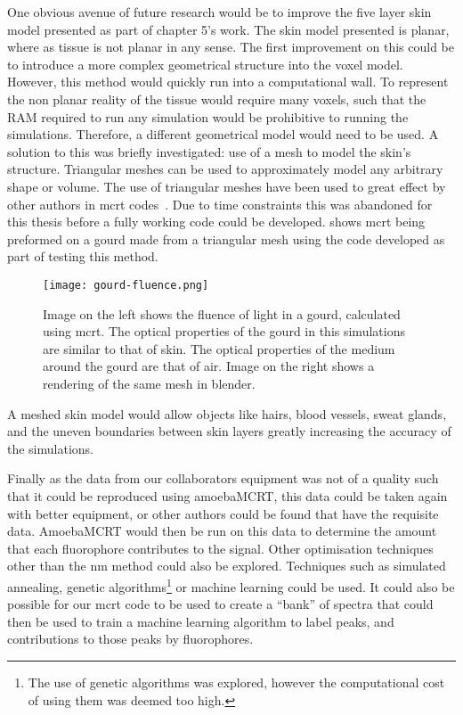 One obvious avenue of future research would be to improve the five layer skin model presented as part of chapter 5's work.
The skin model presented is planar, where as tissue is not planar in any sense.
The first improvement on this could be to introduce a more complex geometrical structure into the voxel model.
However, this method would quickly run into a computational wall.
To represent the non planar reality of the tissue would require many voxels, such that the RAM required to run any simulation would be prohibitive to running the simulations.
Therefore, a different geometrical model would need to be used.
A solution to this was briefly investigated: use of a mesh to model the skin's structure.
Triangular meshes can be used to approximately model any arbitrary shape or volume.
The use of triangular meshes have been used to great effect by other authors in \gls*{mcrt} codes~\cite{badal2009penmesh,margallo2007shape}.
Due to time constraints this was abandoned for this thesis before a fully working code could be developed.
 shows \gls*{mcrt} being preformed on a gourd made from a triangular mesh using the code developed as part of testing this method.

\begin{figure}[!htpb]
    \centering
    \texttt{[image: gourd-fluence.png]}
    \caption{Image on the left shows the fluence of light in a gourd, calculated using \gls*{mcrt}. The optical properties of the gourd in this simulations are similar to that of skin. The optical properties of the medium around the gourd are that of air. Image on the right shows a rendering of the same mesh in blender.}
    \label{fig:mesh}
\end{figure}

A meshed skin model would allow objects like hairs, blood vessels, sweat glands, and the uneven boundaries between skin layers greatly increasing the accuracy of the simulations.

Finally as the data from our collaborators equipment was not of a quality such that it could be reproduced using amoebaMCRT, this data could be taken again with better equipment, or other authors could be found that have the requisite data. 
AmoebaMCRT would then be run on this data to determine the amount that each fluorophore contributes to the signal.
Other optimisation techniques other than the \gls*{nm} method could also be explored.
Techniques such as simulated annealing, genetic algorithms\footnote{The use of genetic algorithms was explored, however the computational cost of using them was deemed too high.} or machine learning could be used.
It could also be possible for our \gls*{mcrt} code to be used to create a ``bank'' of spectra that could then be used to train a machine learning algorithm to label peaks, and contributions to those peaks by fluorophores.

